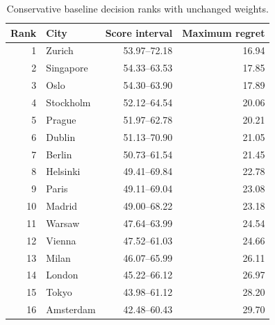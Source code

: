 \begin{table}[!ht]\centering
\caption{Conservative baseline decision ranks with unchanged weights.}\label{tab:baseline}
\begin{tabular}{rlrr}\toprule
Rank & City & Score interval & Maximum regret\\\midrule
1 & Zurich & 53.97--72.18 & 16.94 \\
2 & Singapore & 54.33--63.53 & 17.85 \\
3 & Oslo & 54.30--63.90 & 17.89 \\
4 & Stockholm & 52.12--64.54 & 20.06 \\
5 & Prague & 51.97--62.78 & 20.21 \\
6 & Dublin & 51.13--70.90 & 21.05 \\
7 & Berlin & 50.73--61.54 & 21.45 \\
8 & Helsinki & 49.41--69.84 & 22.78 \\
9 & Paris & 49.11--69.04 & 23.08 \\
10 & Madrid & 49.00--68.22 & 23.18 \\
11 & Warsaw & 47.64--63.99 & 24.54 \\
12 & Vienna & 47.52--61.03 & 24.66 \\
13 & Milan & 46.07--65.99 & 26.11 \\
14 & London & 45.22--66.12 & 26.97 \\
15 & Tokyo & 43.98--61.12 & 28.20 \\
16 & Amsterdam & 42.48--60.43 & 29.70 \\
\bottomrule\end{tabular}\end{table}
